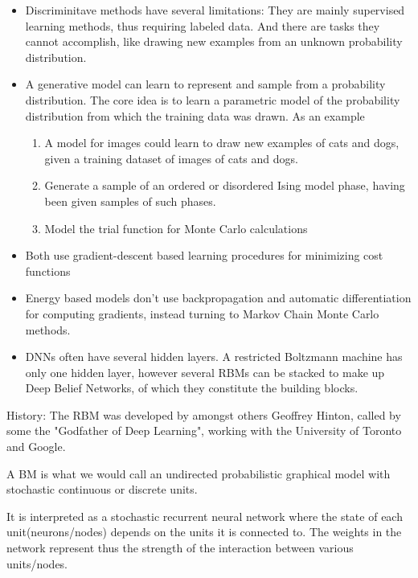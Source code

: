 \documentclass[%
oneside,                 %
final,                   %
10pt]{article}
\begin{document}
\begin{itemize}
\item Discriminitave methods have several limitations: They are mainly supervised learning methods, thus requiring labeled data. And there are tasks they cannot accomplish, like drawing new examples from an unknown probability distribution.

\item A generative model can learn to represent and sample from a probability distribution. The core idea is to learn a parametric model of the probability distribution from which the training data was drawn. As an example
\begin{enumerate}

 \item A model for images could learn to draw new examples of cats and dogs, given a training dataset of images of cats and dogs.

 \item Generate a sample of an ordered or disordered Ising model phase, having been given samples of such phases.

 \item Model the trial function for Monte Carlo calculations

\end{enumerate}

\noindent
\item Both use gradient-descent based learning procedures for minimizing cost functions

\item Energy based models don't use backpropagation and automatic differentiation for computing gradients, instead turning to Markov Chain Monte Carlo methods.

\item DNNs often have several hidden layers. A restricted Boltzmann machine has only one hidden layer, however several RBMs can be stacked to make up Deep Belief Networks, of which they constitute the building blocks.
\end{itemize}

\noindent
History: The RBM was developed by amongst others Geoffrey Hinton, called by some the "Godfather of Deep Learning", working with the University of Toronto and Google.

A BM is what we would call an undirected probabilistic graphical model
with stochastic continuous or discrete units.

It is interpreted as a stochastic recurrent neural network where the
state of each unit(neurons/nodes) depends on the units it is connected
to. The weights in the network represent thus the strength of the
interaction between various units/nodes.
\end{document}
